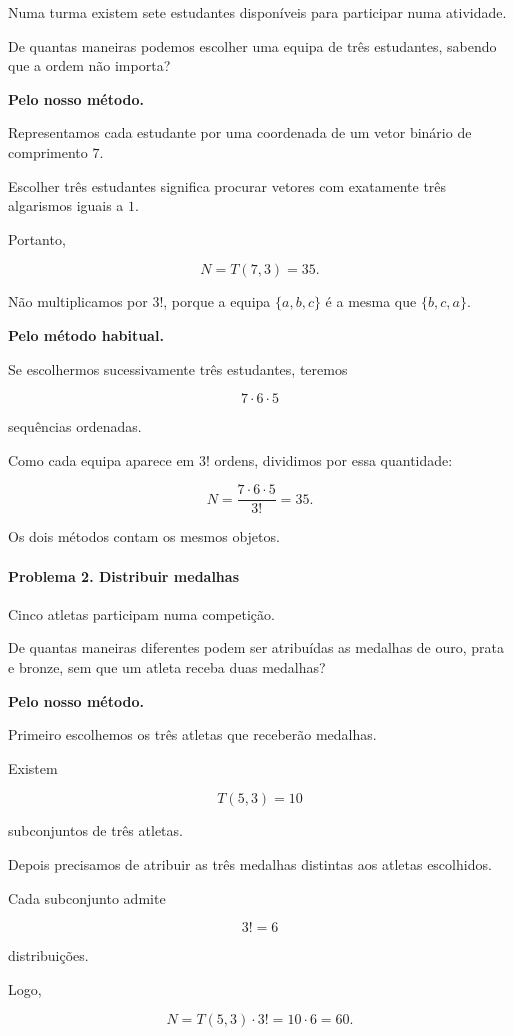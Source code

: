 \documentclass[11pt,a4paper,oneside]{book}
\begin{document}
Numa turma existem sete estudantes disponíveis
para participar numa atividade.

De quantas maneiras podemos escolher uma equipa
de três estudantes, sabendo que a ordem
não importa?

\textbf{Pelo nosso método.}

Representamos cada estudante por uma coordenada
de um vetor binário de comprimento $7$.

Escolher três estudantes significa procurar
vetores com exatamente três algarismos iguais a $1$.

Portanto,

\[
N=T(7,3)=35.
\]

Não multiplicamos por $3!$, porque a equipa
$\{a,b,c\}$ é a mesma que $\{b,c,a\}$.

\textbf{Pelo método habitual.}

Se escolhermos sucessivamente três estudantes,
teremos

\[
7\cdot6\cdot5
\]

sequências ordenadas.

Como cada equipa aparece em $3!$ ordens,
dividimos por essa quantidade:

\[
N=\frac{7\cdot6\cdot5}{3!}=35.
\]

Os dois métodos contam os mesmos objetos.

\paragraph{Problema 2. Distribuir medalhas}

Cinco atletas participam numa competição.

De quantas maneiras diferentes podem ser
atribuídas as medalhas de ouro, prata e bronze,
sem que um atleta receba duas medalhas?

\textbf{Pelo nosso método.}

Primeiro escolhemos os três atletas
que receberão medalhas.

Existem

\[
T(5,3)=10
\]

subconjuntos de três atletas.

Depois precisamos de atribuir as três medalhas
distintas aos atletas escolhidos.

Cada subconjunto admite

\[
3!=6
\]

distribuições.

Logo,

\[
N=T(5,3)\cdot3!=10\cdot6=60.
\]
\end{document}
